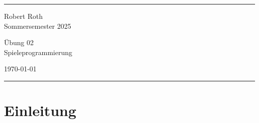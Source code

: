 \documentclass[a4paper]{article}
\begin{document}

\fancyhead[C]{}
\hrule \medskip %
\begin{minipage}{0.295\textwidth} 
\raggedright
\footnotesize
Robert Roth \hfill\\   
Sommersemester 2025\hfill\\  
\end{minipage}
\begin{minipage}{0.4\textwidth} 
\centering 
\large 
Übung 02\\ 
\normalsize 
Spieleprogrammierung\\ 
\end{minipage}
\begin{minipage}{0.295\textwidth} 
\raggedleft
\today\hfill\\
\end{minipage}
\medskip\hrule 
\bigskip



\section{Einleitung}
\end{document}
